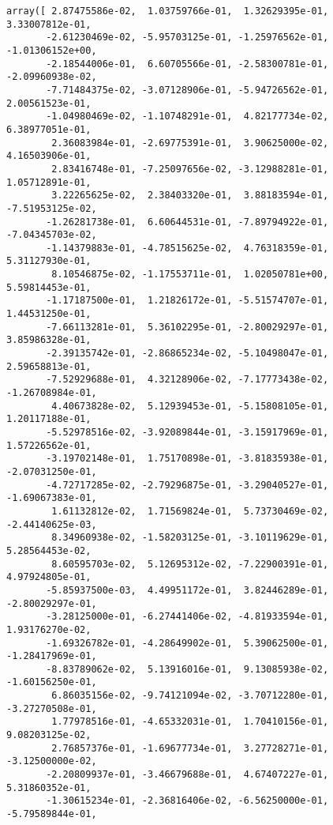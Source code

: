 \documentclass[11pt]{article}
\makeatletter
\newcommand{\boxspacing}{\kern\kvtcb@left@rule\kern\kvtcb@boxsep}
\newcommand{\prompt}[4]{
        \ttfamily\llap{{\color{#2}[#3]:\hspace{3pt}#4}}\vspace{-\baselineskip}
    }
\makeatother
\begin{document}
            \begin{tcolorbox}[breakable, size=fbox, boxrule=.5pt, pad at break*=1mm, opacityfill=0]
\prompt{Out}{outcolor}{15}{\boxspacing}
\begin{Verbatim}[commandchars=\\\{\}]
array([ 2.87475586e-02,  1.03759766e-01,  1.32629395e-01,  3.33007812e-01,
       -2.61230469e-02, -5.95703125e-01, -1.25976562e-01, -1.01306152e+00,
       -2.18544006e-01,  6.60705566e-01, -2.58300781e-01, -2.09960938e-02,
       -7.71484375e-02, -3.07128906e-01, -5.94726562e-01,  2.00561523e-01,
       -1.04980469e-02, -1.10748291e-01,  4.82177734e-02,  6.38977051e-01,
        2.36083984e-01, -2.69775391e-01,  3.90625000e-02,  4.16503906e-01,
        2.83416748e-01, -7.25097656e-02, -3.12988281e-01,  1.05712891e-01,
        3.22265625e-02,  2.38403320e-01,  3.88183594e-01, -7.51953125e-02,
       -1.26281738e-01,  6.60644531e-01, -7.89794922e-01, -7.04345703e-02,
       -1.14379883e-01, -4.78515625e-02,  4.76318359e-01,  5.31127930e-01,
        8.10546875e-02, -1.17553711e-01,  1.02050781e+00,  5.59814453e-01,
       -1.17187500e-01,  1.21826172e-01, -5.51574707e-01,  1.44531250e-01,
       -7.66113281e-01,  5.36102295e-01, -2.80029297e-01,  3.85986328e-01,
       -2.39135742e-01, -2.86865234e-02, -5.10498047e-01,  2.59658813e-01,
       -7.52929688e-01,  4.32128906e-02, -7.17773438e-02, -1.26708984e-01,
        4.40673828e-02,  5.12939453e-01, -5.15808105e-01,  1.20117188e-01,
       -5.52978516e-02, -3.92089844e-01, -3.15917969e-01,  1.57226562e-01,
       -3.19702148e-01,  1.75170898e-01, -3.81835938e-01, -2.07031250e-01,
       -4.72717285e-02, -2.79296875e-01, -3.29040527e-01, -1.69067383e-01,
        1.61132812e-02,  1.71569824e-01,  5.73730469e-02, -2.44140625e-03,
        8.34960938e-02, -1.58203125e-01, -3.10119629e-01,  5.28564453e-02,
        8.60595703e-02,  5.12695312e-02, -7.22900391e-01,  4.97924805e-01,
       -5.85937500e-03,  4.49951172e-01,  3.82446289e-01, -2.80029297e-01,
       -3.28125000e-01, -6.27441406e-02, -4.81933594e-01,  1.93176270e-02,
       -1.69326782e-01, -4.28649902e-01,  5.39062500e-01, -1.28417969e-01,
       -8.83789062e-02,  5.13916016e-01,  9.13085938e-02, -1.60156250e-01,
        6.86035156e-02, -9.74121094e-02, -3.70712280e-01, -3.27270508e-01,
        1.77978516e-01, -4.65332031e-01,  1.70410156e-01,  9.08203125e-02,
        2.76857376e-01, -1.69677734e-01,  3.27728271e-01, -3.12500000e-02,
       -2.20809937e-01, -3.46679688e-01,  4.67407227e-01,  5.31860352e-01,
       -1.30615234e-01, -2.36816406e-02, -6.56250000e-01, -5.79589844e-01,

\end{Verbatim}
\end{tcolorbox}
\end{document}
